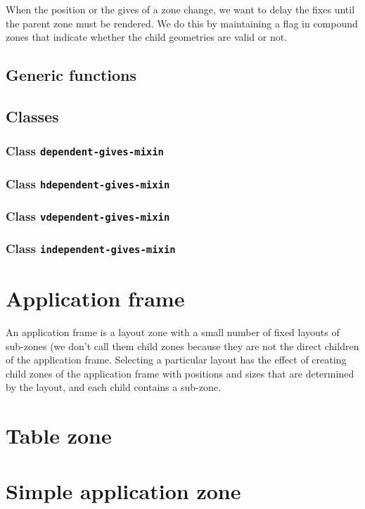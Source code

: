 \documentclass{report}
\begin{document}
When the position or the gives of a zone change, we want to delay the
fixes until the parent zone must be rendered.  We do this by
maintaining a flag in compound zones that indicate whether the child
geometries are valid or not.  

\subsection{Generic functions}

\subsection{Classes}

\subsubsection{Class \texttt{dependent-gives-mixin}}
\subsubsection{Class \texttt{hdependent-gives-mixin}}
\subsubsection{Class \texttt{vdependent-gives-mixin}}
\subsubsection{Class \texttt{independent-gives-mixin}}

\section{Application frame}

An application frame is a layout zone with a small number of fixed
layouts of sub-zones (we don't call them child zones because they
are not the direct children of the application frame.  Selecting a
particular layout has the effect of creating child zones of the
application frame with positions and sizes that are determined by the
layout, and each child contains a sub-zone.

\section{Table zone}

\section{Simple application zone}
\end{document}
